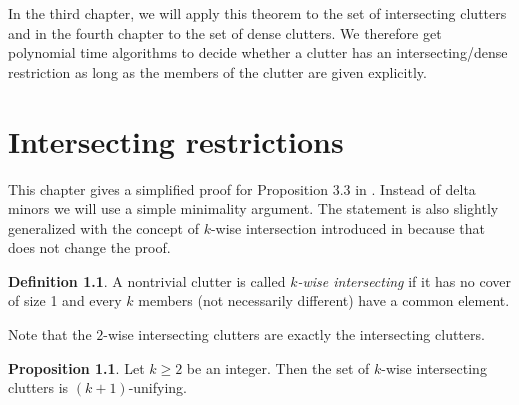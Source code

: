 \documentclass[a4paper, 12pt, twoside=false]{scrbook}
\theoremstyle{definition}
\newtheorem*{definition}{Definition}
\newtheorem{proposition}[theorem]{Proposition}
\begin{document}
   In the third chapter, we will apply this theorem to the set of intersecting clutters and in the fourth chapter to the set of dense clutters.
   We therefore get polynomial time algorithms to decide whether a clutter has an intersecting/dense restriction as long as the members of the clutter are given explicitly.

   \chapter{Intersecting restrictions}
   This chapter gives a simplified proof for Proposition 3.3 in \cite{restrictions}.
   Instead of delta minors we will use a simple minimality argument.
   The statement is also slightly generalized with the concept of $k$-wise intersection introduced in \cite{k-wise} because that does not change the proof.
   \begin{definition}
       A nontrivial clutter is called \emph{$k$-wise intersecting} if it has no cover of size 1 and every $k$ members (not necessarily different) have a common element.
   \end{definition}

   Note that the $2$-wise intersecting clutters are exactly the intersecting clutters.
   \begin{proposition}
       Let $k\geq 2$ be an integer.
       Then the set of $k$-wise intersecting clutters is $(k+1)$-unifying.
   \end{proposition}
\end{document}
